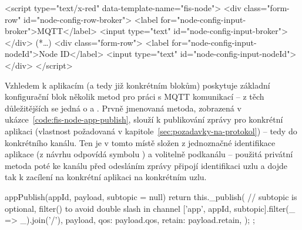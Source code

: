 \begin{code}[
    language=HTML,
    label=code:fis-node-template,
    caption={Ukázka z implementace druhé povinné části deklarace bloku -- šablona formuláře v jazyce HTML obsahuje
jednotlivé vstupní pro pole pro korespondující parametry definovené v registraci bloku do editoru
v ukázce~\ref{code:fis-node-constructor}.
Atribut \ic{id="node-config-input-broker"} (a odpovídající) jsou důležité vzhledem k chování editoru, nutná je shoda
s názvem parametru při registraci bloku -- stejně jako správné spárování šablony pomocí atributu
\ic{data-template-name="fis-node"}.},
]
<script type="text/x-red" data-template-name="fis-node">
    <div class="form-row" id="node-config-row-broker">
        <label for="node-config-input-broker">MQTT</label>
        <input type="text" id="node-config-input-broker">
    </div>
    (*\ldots*)
    <div class="form-row">
        <label for="node-config-input-nodeId">Node ID</label>
        <input type="text" id="node-config-input-nodeId">
    </div>
</script>
\end{code}

Vzhledem k aplikacím (a tedy již konkrétním blokům) poskytuje základní konfigurační blok několik metod pro práci s
MQTT komunikací -- z těch důležitějších se jedná o  a .
Prvně jmenovaná metoda, zobrazená v ukázce~\ref{code:fis-node-app-publish}, slouží k publikování zprávy pro
konkrétní aplikaci (vlastnost požadovaná v kapitole~\ref{sec:pozadavky-na-protokol}) -- tedy do konkrétního kanálu.
Ten je v tomto místě složen z jednoznačné identifikace aplikace  (z návrhu odpovídá symbolu ) a
volitelně podkanálu -- použitá privátní metoda  poté ke kanálu před odesláním zprávy připojí identifikaci
uzlu a dojde tak k zacílení na konkrétní aplikaci na konkrétním uzlu.

\begin{code}[
    language=Javascript,
    label=code:fis-node-app-publish,
    caption={Detail z implementace třídy \ic{FisNode} -- metoda \ic{appPublish} poskytuje možnost konkrétnímu bloku
odeslání zprávy do odpovídající aplikace na uzlu.}
]
appPublish(appId, payload, subtopic = null) {
    return this._publish(
        // subtopic is optional, filter() to avoid double slash in channel
        ['app', appId, subtopic].filter(_ => _).join('/'),
        {
            payload,
            qos: payload.qos,
            retain: payload.retain,
        }
    );
};
\end{code}

